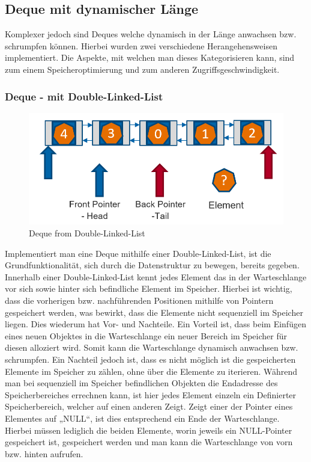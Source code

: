 \documentclass{TUBAFarbeiten}
\begin{document}
\subsection{Deque mit dynamischer Länge}
Komplexer jedoch sind Deques welche dynamisch in der Länge anwachsen bzw. schrumpfen können. Hierbei wurden zwei verschiedene Herangehensweisen implementiert. Die Aspekte, mit welchen man dieses Kategorisieren kann, sind zum einem Speicheroptimierung und zum anderen Zugriffsgeschwindigkeit. 
\subsubsection{Deque - mit Double-Linked-List} 
\begin{figure}
\includegraphics[scale=0.35]{Deque-LinkedList}
\caption{Deque from Double-Linked-List}
\label{fig:Img2}
\end{figure}
Implementiert man eine Deque mithilfe einer Double-Linked-List, ist die Grundfunktionalität, sich durch die Datenstruktur zu bewegen, bereits gegeben. Innerhalb einer Double-Linked-List kennt jedes Element das in der Warteschlange vor sich sowie hinter sich befindliche Element im Speicher. Hierbei ist wichtig, dass die vorherigen bzw. nachführenden Positionen mithilfe von Pointern gespeichert werden, was bewirkt, dass die Elemente nicht sequenziell im Speicher liegen. Dies wiederum hat Vor- und Nachteile. Ein Vorteil ist, dass beim Einfügen eines neuen Objektes in die Warteschlange ein neuer Bereich im Speicher für diesen alloziert wird. Somit kann die Warteschlange dynamisch anwachsen bzw. schrumpfen. Ein Nachteil jedoch ist, dass es nicht möglich ist die gespeicherten Elemente im Speicher zu zählen, ohne über die Elemente zu iterieren. Während man bei sequenziell im Speicher befindlichen Objekten die Endadresse des Speicherbereiches errechnen kann, ist hier jedes Element einzeln ein Definierter Speicherbereich, welcher auf einen anderen Zeigt. Zeigt einer der Pointer eines Elementes auf „NULL“, ist dies entsprechend ein Ende der Warteschlange. Hierbei müssen lediglich die beiden Elemente, worin jeweils ein NULL-Pointer gespeichert ist, gespeichert werden und man kann die Warteschlange von vorn bzw. hinten aufrufen. 
\end{document}
